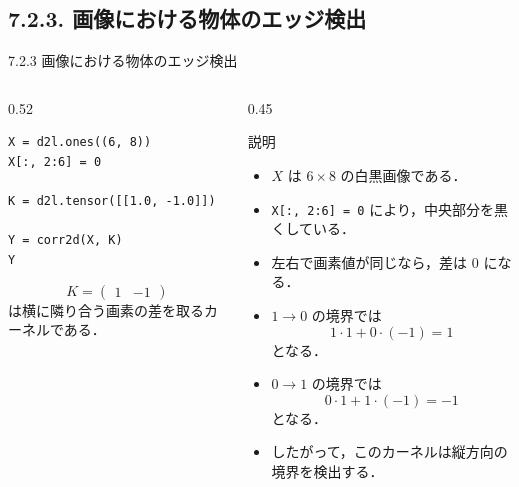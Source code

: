 \documentclass[dvipdfmx,uplatex,unicode,9pt,aspectratio=169]{beamer}
\begin{document}
\subsection{7.2.3. 画像における物体のエッジ検出}
\begin{frame}[fragile]{7.2.3 画像における物体のエッジ検出}
\begin{columns}[T,onlytextwidth]
\begin{column}{0.52\textwidth}
\begin{lstlisting}
X = d2l.ones((6, 8))
X[:, 2:6] = 0

K = d2l.tensor([[1.0, -1.0]])

Y = corr2d(X, K)
Y
\end{lstlisting}

\begin{seminaralertbox}
\[
K=\begin{pmatrix}1&-1\end{pmatrix}
\]
は横に隣り合う画素の差を取るカーネルである．
\end{seminaralertbox}
\end{column}

\begin{column}{0.45\textwidth}
\begin{block}{説明}
\begin{itemize}
\item $X$ は $6\times8$ の白黒画像である．
\item \texttt{X[:, 2:6] = 0} により，中央部分を黒くしている．
\item 左右で画素値が同じなら，差は $0$ になる．
\item $1\to0$ の境界では
\[
1\cdot1+0\cdot(-1)=1
\]
となる．
\item $0\to1$ の境界では
\[
0\cdot1+1\cdot(-1)=-1
\]
となる．
\item したがって，このカーネルは縦方向の境界を検出する．
\end{itemize}
\end{block}
\end{column}
\end{columns}
\end{frame}
\end{document}
